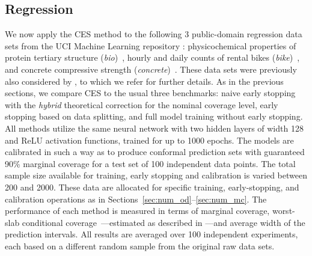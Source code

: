 \subsection{Regression}


We now apply the CES method to the following 3 public-domain regression data sets from the UCI Machine Learning repository \cite{Pinar2012}: physicochemical properties of protein tertiary structure ({\em bio})~\cite{data-bio}, hourly and daily counts of rental bikes ({\em bike})~\cite{data-bike}, and concrete compressive strength ({\em concrete})~\cite{data-concrete}. These data sets were previously also considered by \citet{romano2019conformalized}, to which we refer for further details.
As in the previous sections, we compare CES to the usual three benchmarks: naive early stopping with the {\em hybrid} theoretical correction for the nominal coverage level, early stopping based on data splitting, and full model training without early stopping.
All methods utilize the same neural network with two hidden layers of width 128 and ReLU activation functions, trained for up to 1000 epochs.
The models are calibrated in such a way as to produce conformal prediction sets with guaranteed 90\% marginal coverage for a test set of 100 independent data points.
The total sample size available for training, early stopping and calibration is varied between 200 and 2000.
These data are allocated for specific training, early-stopping, and calibration operations as in Sections~\ref{sec:num_od}--\ref{sec:num_mc}.
The performance of each method is measured in terms of marginal coverage, worst-slab conditional coverage~\cite{cauchois2020knowing}---estimated as described in \citet{sesia2020comparison}---and average width of the prediction intervals. All results are averaged over 100 independent experiments, each based on a different random sample from the original raw data sets.


